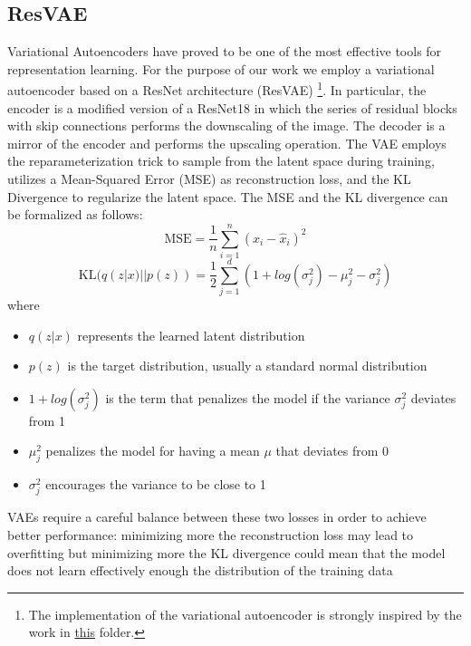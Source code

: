\documentclass[peerreview]{IEEEtran}
\begin{document}
\subsection{ResVAE}
Variational Autoencoders \cite{vae} have proved to be one of the most effective tools for representation learning. For the purpose of our work we employ a variational autoencoder based on a ResNet \cite{resnet} architecture (ResVAE)
\footnote{
    The implementation of the variational autoencoder is strongly inspired by the work in \href{https://github.com/julianstastny/VAE-ResNet18-PyTorch}{this} folder.
}. In particular, the encoder is a modified version of a ResNet18 in which the series of residual blocks with skip connections performs the downscaling of the image. The decoder is a mirror of the encoder and performs the upscaling operation.
The VAE employs the reparameterization trick to sample from the latent space during training, utilizes a Mean-Squared Error (MSE) as reconstruction loss, and the KL Divergence to regularize the latent space. The MSE and the KL divergence can be formalized as follows:
\begin{equation}
    \text{MSE}= \frac{1}{n} \sum_{i=1}^n (x_i - \hat{x}_i)^2
\end{equation}
\begin{equation}
    \text{KL}(q(z|x)||p(z))=\frac{1}{2} \sum_{j=1}^d (1+log(\sigma_j^2)-\mu_j^2-\sigma_j^2)
\end{equation}
where
\begin{itemize}
    \item $q(z|x)$ represents the learned latent distribution
    \item $p(z)$ is the target distribution, usually a standard normal distribution
    \item $1+log(\sigma_j^2)$ is the term that penalizes the model if the variance $\sigma_j^2$ deviates from 1
    \item $\mu_j^2$ penalizes the model for having a mean $\mu$ that deviates from 0
    \item $\sigma_j^2$ encourages the variance to be close to 1
\end{itemize}
VAEs require a careful balance between these two losses in order to achieve better performance: minimizing more the reconstruction loss may lead to overfitting but minimizing more the KL divergence could mean that the model does not learn effectively enough the distribution of the training data
\end{document}
